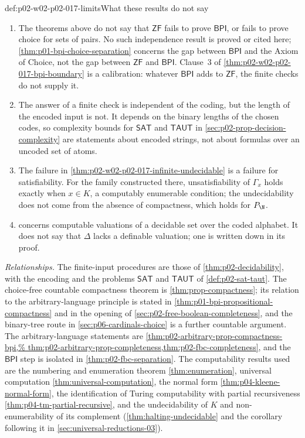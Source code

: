 \begin{hbwarning}{def:p02-w02-p02-017-limits}{What these results do not say}
\begin{enumerate}
 \item The theorems above do not say that \(\mathsf{ZF}\) fails to prove
       \(\mathsf{BPI}\), or fails to prove choice for sets of pairs.  No
       such independence result is proved or cited here;
       \cref{thm:p01-bpi-choice-separation} concerns the gap between
       \(\mathsf{BPI}\) and the Axiom of Choice, not the gap between
       \(\mathsf{ZF}\) and \(\mathsf{BPI}\).  Clause~3 of
       \cref{thm:p02-w02-p02-017-bpi-boundary} is a calibration: whatever
       \(\mathsf{BPI}\) adds to \(\mathsf{ZF}\), the finite checks do not
       supply it.
 \item The answer of a finite check is independent of the coding, but
       the length of the encoded input is not.  It depends on the binary
       lengths of the chosen codes, so complexity bounds for
       \(\mathsf{SAT}\) and \(\mathsf{TAUT}\) in
       \cref{sec:p02-prop-decision-complexity} are statements about
       encoded strings, not about formulas over an uncoded set of atoms.
 \item The failure in \cref{thm:p02-w02-p02-017-infinite-undecidable} is
       a failure for satisfiability.  For the family constructed there,
       unsatisfiability of \(\Gamma_x\) holds exactly when \(x\in K\), a
       computably enumerable condition; the undecidability does not come
       from the absence of compactness, which holds for \(P_{\N}\).
 \item {} concerns
       computable valuations of a decidable set over the coded alphabet.
       It does not say that \(\Delta\) lacks a definable valuation; one is
       written down in its proof.
\end{enumerate}
\end{hbwarning}

\emph{Relationships.}  The finite-input procedures are those of
\cref{thm:p02-decidability}, with the encoding and the problems
\(\mathsf{SAT}\) and \(\mathsf{TAUT}\) of \cref{def:p02-sat-taut}.  The
choice-free countable compactness theorem is \cref{thm:prop-compactness};
its relation to the arbitrary-language principle is stated in
\cref{thm:p01-bpi-propositional-compactness} and in the opening of
\cref{sec:p02-free-boolean-completeness}, and the binary-tree route in
\cref{sec:p06-cardinals-choice} is a further countable argument.  The
arbitrary-language statements are
\cref{thm:p02-arbitrary-prop-compactness-bpi,%
thm:p02-arbitrary-prop-completeness,thm:p02-fbc-completeness}, and the
\(\mathsf{BPI}\) step is isolated in \cref{thm:p02-fbc-separation}.  The
computability results used are the numbering and enumeration theorem
\cref{thm:enumeration}, universal computation
\cref{thm:universal-computation}, the normal form
\cref{thm:p04-kleene-normal-form}, the identification of Turing
computability with partial recursiveness
\cref{thm:p04-tm-partial-recursive}, and the undecidability of \(K\) and
non-enumerability of its complement
(\cref{thm:halting-undecidable} and the corollary following it in
\cref{sec:universal-reductions-03}).

